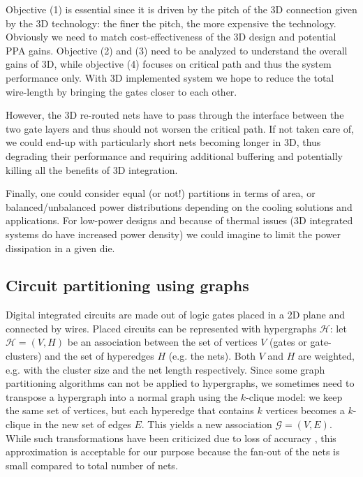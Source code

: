\documentclass[conference]{IEEEtran}
\begin{document}
Objective (1) is essential since it is driven by the pitch of the 3D connection given by the 3D technology: the finer the pitch, the more expensive the technology. Obviously we need to match cost-effectiveness of the 3D design and potential PPA gains. Objective (2) and (3) need to be analyzed to understand the overall gains of 3D, while objective (4) focuses on critical path and thus the system performance only. With 3D implemented system we hope to reduce the total wire-length by bringing the gates closer to each other. 

However, the 3D re-routed nets have to pass through the interface between the two gate layers and thus should not worsen the critical path. If not taken care of, we could end-up with particularly short nets becoming longer in 3D, thus degrading their performance and requiring additional buffering and potentially killing all the benefits of 3D integration.

Finally, one could consider equal (or not!) partitions in terms of area, or balanced/unbalanced power distributions depending on the cooling solutions and applications. For low-power designs and because of thermal issues (3D integrated systems do have increased power density) we could imagine to limit the power dissipation in a given die.

\subsection{Circuit partitioning using graphs}\label{sec:partitioning}
Digital integrated circuits are made out of logic gates placed in a 2D plane and connected by wires. Placed circuits can be represented with hypergraphs $\mathcal{H}$: let $\mathcal{H} = (V, H)$ be an association between the set of vertices $V$ (gates or gate-clusters) and the set of hyperedges $H$ (e.g. the nets). Both $V$ and $H$ are weighted, e.g. with the cluster size and the net length respectively. Since some graph partitioning algorithms can not be applied to hypergraphs, we sometimes need to transpose a hypergraph into a normal graph using the $k$-clique model: we keep the same set of vertices, but each hyperedge that contains $k$ vertices becomes a $k$-clique in the new set of edges $E$. This yields a new association $\mathcal{G} = (V, E)$. While such transformations have been criticized  due to loss of accuracy \cite{IhlerEdmund;WagnerDorothea;Wagner1993}, this approximation is acceptable for our purpose because the fan-out of the nets is small compared to total number of nets.
\end{document}
